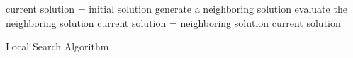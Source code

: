 \setlength{\textfloatsep}{0.2cm}
\begin{algorithm2e}[htb]
	current solution = initial solution\;
	{
		generate a neighboring solution\;
		evaluate the neighboring solution\;
		{
			current solution = neighboring solution\;
		}
	}
	\Return current solution\;
	\caption{Local Search Algorithm}
	\label{algo:local_search}
\end{algorithm2e}
\setlength{\textfloatsep}{0.2cm}